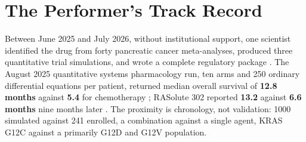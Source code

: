 \section{The Performer's Track Record}

Between June 2025 and July 2026, without institutional support, one scientist
identified the drug from forty pancreatic cancer meta-analyses, produced three
quantitative trial simulations, and wrote a complete regulatory package
\cite{foundingdocs,daraxident}. The August 2025 quantitative systems
pharmacology run, ten arms and 250 ordinary differential equations per patient,
returned median overall survival of \textbf{12.8 months} against \textbf{5.4}
for chemotherapy \cite{qspmetpancre}; RASolute 302 reported \textbf{13.2}
against \textbf{6.6 months} nine months later \cite{rasolute302}. The proximity
is chronology, not validation: 1000 simulated against 241 enrolled, a
combination against a single agent, KRAS G12C against a primarily G12D and G12V
population.


